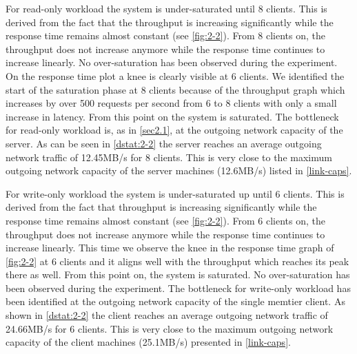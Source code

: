\documentclass[11pt,a4paper]{article}
\begin{document}

For read-only workload the system is under-saturated until 8 clients. This is derived from the fact that the throughput is increasing significantly while the response time remains almost constant (see \autoref{fig:2-2}). From 8 clients on, the throughput does not increase anymore while the response time continues to increase linearly. No over-saturation has been observed during the experiment. On the response time plot a knee is clearly visible at 6 clients. We identified the start of the saturation phase at 8 clients because of the throughput graph which increases by over 500 requests per second from 6 to 8 clients with only a small increase in latency. From this point on the system is saturated.
The bottleneck for read-only workload is, as in \autoref{sec2.1}, at the outgoing network capacity of the server. As can be seen in \autoref{dstat:2-2} the server reaches an average outgoing network traffic of 12.45MB/s for 8 clients. This is very close to the maximum outgoing network capacity of the server machines (12.6MB/s) listed in \autoref{link-caps}.

For write-only workload the system is under-saturated up until 6 clients. This is derived from the fact that throughput is increasing significantly while the response time remains almost constant (see \autoref{fig:2-2}). From 6 clients on, the throughput does not increase anymore while the response time continues to increase linearly. This time we observe the knee in the response time graph of \autoref{fig:2-2} at 6 clients and it aligns well with the throughput which reaches its peak there as well. From this point on, the system is saturated. No over-saturation has been observed during the experiment.
The bottleneck for write-only workload has been identified at the outgoing network capacity of the single memtier client. As shown in \autoref{dstat:2-2} the client reaches an average outgoing network traffic of 24.66MB/s for 6 clients. This is very close to the maximum outgoing network capacity of the client machines (25.1MB/s) presented in \autoref{link-caps}.
\end{document}
